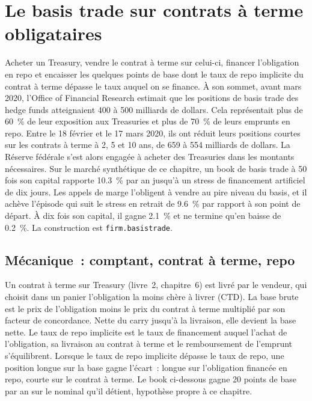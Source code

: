 \chapter{Le basis trade sur contrats à terme obligataires}\label{ch:s2:the-bond-futures-basis-trade}

Acheter un Treasury, vendre le contrat à terme sur celui-ci, financer l'obligation en repo et encaisser les quelques points de base dont le taux de repo implicite du contrat à terme dépasse le
taux auquel on se finance. À son sommet, avant mars 2020, l'Office of Financial Research estimait que les positions de basis trade des hedge funds atteignaient 400 à 500 milliards de dollars. Cela
représentait plus de 60~\% de leur exposition aux Treasuries et plus de 70~\% de leurs emprunts en repo. Entre le 18 février et le 17 mars 2020, ils ont réduit leurs
positions courtes sur les contrats à terme à 2, 5 et 10 ans, de 659 à 554 milliards de dollars. La Réserve fédérale s'est alors engagée à acheter des Treasuries dans
les montants nécessaires. Sur le marché synthétique de ce chapitre, un book de basis trade à 50 fois son capital rapporte 10.3~\% par an jusqu'à un stress de financement
artificiel de dix jours. Les appels de marge l'obligent à vendre au pire niveau du basis, et il achève l'épisode qui suit le stress en retrait de 9.6~\% par rapport à son point de départ. À dix fois son capital, il gagne 2.1~\%
et ne termine qu'en baisse de 0.2~\%. La construction est \texttt{firm.basistrade}.

\section{Mécanique~: comptant, contrat à terme, repo}

Un contrat à terme sur Treasury (livre~2, chapitre~6) est livré par le vendeur, qui choisit dans un panier l'obligation la moins chère à livrer (CTD). La base brute est le
prix de l'obligation moins le prix du contrat à terme multiplié par son facteur de concordance. Nette du carry jusqu'à la livraison, elle devient la base nette. Le taux de repo implicite est le taux de financement
auquel l'achat de l'obligation, sa livraison au contrat à terme et le remboursement de l'emprunt s'équilibrent. Lorsque le taux de repo implicite dépasse le taux de repo, une
position longue sur la base gagne l'écart~: longue sur l'obligation financée en repo, courte sur le contrat à terme. Le book ci-dessous gagne 20 points de base par an sur le nominal
qu'il détient, hypothèse propre à ce chapitre.

